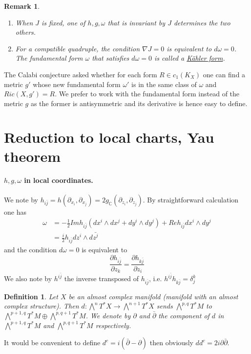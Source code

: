 \documentclass[11pt]{article}
\newtheorem{remark}{Remark}
\newtheorem{definition}{Definition}
\begin{document}
\begin{remark}
\begin{enumerate}
\item When \(J\) is fixed, one of \(h,g,\omega\) that is invariant by \(J\) determines the two others.
\item For a compatible quadruple, the condition \(\nabla J = 0\) is equivalent to \(d\omega = 0\). The
fundamental form \(\omega\) that satisfies \(d\omega = 0\) is called a \uline{Kähler form}.
\end{enumerate}
\end{remark}


The Calabi conjecture asked whether for each form \(R\in c_1(K_X)\) one can find a metric \(g'\) whose
new fundamental form \(\omega'\) is in the same class of \(\omega\) and \(Ric(X,g') = R\). We prefer to
work with the fundamental form instead of the metric \(g\) as the former is antisymmetric and its
derivative is hence easy to define.

\section{Reduction to local charts, Yau theorem}
\label{sec:orgec41f20}
\paragraph{\(h,g,\omega\) in local coordinates.}
\label{sec:orga12bb61}
We note by \(h_{i\bar j} = h(\partial_{x_i},\partial_{x_j}) =
2g_{\mathbb{C}}(\partial_{z_i},\partial_{z_j})\). By straightforward calculation one has
\begin{align*}
\omega & = -\frac{1}{2} Im h_{i\bar j} (dx^i\wedge dx^j + dy^i\wedge dy^j) + Re h_{i\bar j}dx^i\wedge dy^j\\
& = \frac{i}{2}h_{i\bar j}dz^i\wedge d\bar{z^j}
\end{align*}
and the condition \(d\omega = 0\) is equivalent to
\[
\frac{\partial h_{i\bar j}}{\partial z_k} = \frac{\partial h_{k\bar j}}{\partial z_i}
\]
We also note by \(h^{i\bar j}\) the inverse transposed of \(h_{i\bar j}\), i.e. \(h^{i\bar j}h_{k\bar j}
= \delta_j^k\)
\begin{definition}
Let \(X\) be an almost complex manifold (manifold with an almost complex structure). Then
\(d:\bigwedge^nT^*X\longrightarrow \bigwedge^{n+1}T^*X\) sends \(\bigwedge^{p,q}T^*M\) to
\(\bigwedge^{p+1,q}T^*M\oplus \bigwedge^{p,q+1}T^*M\). We denote by \(\partial\) and \(\bar\partial\) the
component of \(d\) in \(\bigwedge^{p+1,q}T^*M\) and \(\bigwedge^{p,q+1}T^*M\) respectively. 
\end{definition}
It would be convenient to define \(d^c =i(\bar\partial - \partial)\) then obviously \(dd^c =
2i\partial\bar\partial\). 
\end{document}
